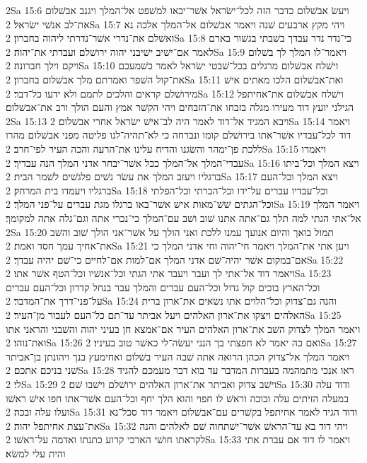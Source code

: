 2Sa 15:6  ויעשׂ אבשׁלום כדבר הזה לכל־ישׂראל אשׁר־יבאו למשׁפט אל־המלך ויגנב אבשׁלום את־לב אנשׁי ישׂראל׃
2Sa 15:7  ויהי מקץ ארבעים שׁנה ויאמר אבשׁלום אל־המלך אלכה נא ואשׁלם את־נדרי אשׁר־נדרתי ליהוה בחברון׃
2Sa 15:8  כי־נדר נדר עבדך בשׁבתי בגשׁור בארם לאמר אם־ישׁיב ישׁיבני יהוה ירושׁלם ועבדתי את־יהוה׃
2Sa 15:9  ויאמר־לו המלך לך בשׁלום ויקם וילך חברונה׃
2Sa 15:10  וישׁלח אבשׁלום מרגלים בכל־שׁבטי ישׂראל לאמר כשׁמעכם את־קול השׁפר ואמרתם מלך אבשׁלום בחברון׃
2Sa 15:11  ואת־אבשׁלום הלכו מאתים אישׁ מירושׁלם קראים והלכים לתמם ולא ידעו כל־דבר׃
2Sa 15:12  וישׁלח אבשׁלום את־אחיתפל הגילני יועץ דוד מעירו מגלה בזבחו את־הזבחים ויהי הקשׁר אמץ והעם הולך ורב את־אבשׁלום׃
2Sa 15:13  ויבא המגיד אל־דוד לאמר היה לב־אישׁ ישׂראל אחרי אבשׁלום׃
2Sa 15:14  ויאמר דוד לכל־עבדיו אשׁר־אתו בירושׁלם קומו ונברחה כי לא־תהיה־לנו פליטה מפני אבשׁלום מהרו ללכת פן־ימהר והשׂגנו והדיח עלינו את־הרעה והכה העיר לפי־חרב׃
2Sa 15:15  ויאמרו עבדי־המלך אל־המלך ככל אשׁר־יבחר אדני המלך הנה עבדיך׃
2Sa 15:16  ויצא המלך וכל־ביתו ברגליו ויעזב המלך את עשׂר נשׁים פלגשׁים לשׁמר הבית׃
2Sa 15:17  ויצא המלך וכל־העם ברגליו ויעמדו בית המרחק׃
2Sa 15:18  וכל־עבדיו עברים על־ידו וכל־הכרתי וכל־הפלתי וכל־הגתים שׁשׁ־מאות אישׁ אשׁר־באו ברגלו מגת עברים על־פני המלך׃
2Sa 15:19  ויאמר המלך אל־אתי הגתי למה תלך גם־אתה אתנו שׁוב ושׁב עם־המלך כי־נכרי אתה וגם־גלה אתה למקומך׃
2Sa 15:20  תמול בואך והיום אנועך עמנו ללכת ואני הולך על אשׁר־אני הולך שׁוב והשׁב את־אחיך עמך חסד ואמת׃
2Sa 15:21  ויען אתי את־המלך ויאמר חי־יהוה וחי אדני המלך כי אם־במקום אשׁר יהיה־שׁם אדני המלך אם־למות אם־לחיים כי־שׁם יהיה עבדך׃
2Sa 15:22  ויאמר דוד אל־אתי לך ועבר ויעבר אתי הגתי וכל־אנשׁיו וכל־הטף אשׁר אתו׃
2Sa 15:23  וכל־הארץ בוכים קול גדול וכל־העם עברים והמלך עבר בנחל קדרון וכל־העם עברים על־פני־דרך את־המדבר׃
2Sa 15:24  והנה גם־צדוק וכל־הלוים אתו נשׂאים את־ארון ברית האלהים ויצקו את־ארון האלהים ויעל אביתר עד־תם כל־העם לעבור מן־העיר׃
2Sa 15:25  ויאמר המלך לצדוק השׁב את־ארון האלהים העיר אם־אמצא חן בעיני יהוה והשׁבני והראני אתו ואת־נוהו׃
2Sa 15:26  ואם כה יאמר לא חפצתי בך הנני יעשׂה־לי כאשׁר טוב בעיניו׃
2Sa 15:27  ויאמר המלך אל־צדוק הכהן הרואה אתה שׁבה העיר בשׁלום ואחימעץ בנך ויהונתן בן־אביתר שׁני בניכם אתכם׃
2Sa 15:28  ראו אנכי מתמהמה בעברות המדבר עד בוא דבר מעמכם להגיד לי׃
2Sa 15:29  וישׁב צדוק ואביתר את־ארון האלהים ירושׁלם וישׁבו שׁם׃
2Sa 15:30  ודוד עלה במעלה הזיתים עלה ובוכה וראשׁ לו חפוי והוא הלך יחף וכל־העם אשׁר־אתו חפו אישׁ ראשׁו ועלו עלה ובכה׃
2Sa 15:31  ודוד הגיד לאמר אחיתפל בקשׁרים עם־אבשׁלום ויאמר דוד סכל־נא את־עצת אחיתפל יהוה׃
2Sa 15:32  ויהי דוד בא עד־הראשׁ אשׁר־ישׁתחוה שׁם לאלהים והנה לקראתו חושׁי הארכי קרוע כתנתו ואדמה על־ראשׁו׃
2Sa 15:33  ויאמר לו דוד אם עברת אתי והית עלי למשׂא׃
